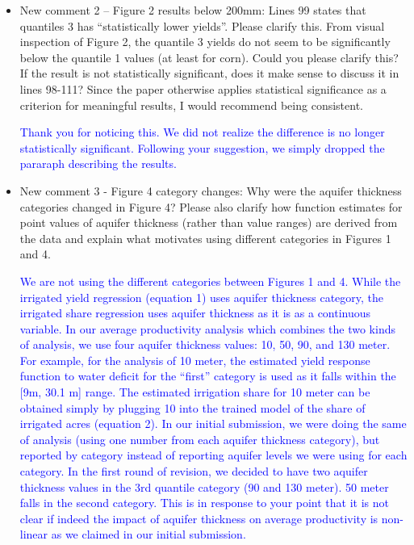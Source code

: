 \documentclass[
]{article}
\begin{document}
\begin{itemize}
\item New comment 2 – Figure 2 results below 200mm: Lines 99 states that quantiles 3 has ``statistically lower yields''. Please clarify this. From visual inspection of Figure 2, the quantile 3 yields do not seem to be significantly below the quantile 1 values (at least for corn). Could you please clarify this? If the result is not statistically significant, does it make sense to discuss it in lines 98-111? Since the paper otherwise applies statistical significance as a criterion for meaningful results, I would recommend being consistent.


    \textcolor{blue}{Thank you for noticing this. We did not realize the difference is no longer statistically significant. Following your suggestion, we simply dropped the pararaph describing the results.}

\item New comment 3 - Figure 4 category changes: Why were the aquifer thickness categories changed in Figure 4? Please also clarify how function estimates for point values of aquifer thickness (rather than value ranges) are derived from the data and explain what motivates using different categories in Figures 1 and 4.

    \textcolor{blue}{We are not using the different categories between Figures 1 and 4. While the irrigated yield regression (equation 1) uses aquifer thickness category, the irrigated share regression uses aquifer thickness as it is as a continuous variable. In our average productivity analysis which combines the two kinds of analysis, we use four aquifer thickness values: 10, 50, 90, and 130 meter. For example, for the analysis of 10 meter, the estimated yield response function to water deficit for the ``first'' category is used as it falls within the [9m, 30.1 m] range. The estimated irrigation share for 10 meter can be obtained simply by plugging 10 into the trained model of the share of irrigated acres (equation 2). In our initial submission, we were doing the same of analysis (using one number from each aquifer thickness category), but reported by category instead of reporting aquifer levels we were using for each category. In the first round of revision, we decided to have two aquifer thickness values in the 3rd quantile category (90 and 130 meter). 50 meter falls in the second category. This is in response to your point that it is not clear if indeed the impact of aquifer thickness on average productivity is non-linear as we claimed in our initial submission.}


\end{itemize}
\end{document}
